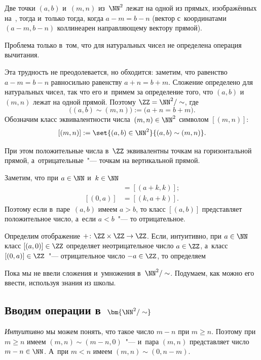Две точки $(a, b)$ и~$(m, n)$ из~$\NN^2$ лежат на одной из прямых, изображённых на~, тогда и~только тогда, когда $a - m = b - n$ (вектор с~координатами $(a - m, b - n)$ коллинеарен направляющему вектору прямой).


Проблема только в~том, что для натуральных чисел не определена операция вычитания.

Эта трудность не преодолевается, но обходится: заметим, что равенство $a - m = b - n$ равносильно равенству $a + n = b + m$. Сложение определено для натуральных чисел, так что его и~примем за определение того, что $(a, b)$ и~$(m, n)$ лежат на одной прямой. Поэтому
$\ZZ = \NN^2 / \sim$, где
\[
	\bigl(
		(a, b) \sim
		(m, n)
	\bigr)
	:=
	\bigl(
		a + n = b + m
	\bigr)
	.
\]
Обозначим класс эквивалентности числа~$(m, n) \in \NN^2$ символом $[(m, n)]$:
\[
	[(m, n)] :=
	\set{(a, b) \in \NN^2}{(a, b) \sim (m, n)}.
\]

При этом положительные числа в~$\ZZ$ эквивалентны точкам на горизонтальной прямой, а~отрицательные~"--- точкам на вертикальной прямой.


Заметим, что при $a \in \NN$ и~$k \in \NN$
\begin{align*}
	[(a, 0)] &= [(a + k, k)];
	\\
	[(0, a)] &= [(k, a + k)].
\end{align*}
Поэтому если в~паре~$(a, b)$ имеем $a > b$, то класс $[(a, b)]$ представляет положительное число, а~если $a < b$~"--- то отрицательное.


Определим отображение $+ \colon \ZZ \times \ZZ \to \ZZ$. Если, интуитивно, при $a \in \NN$ класс $[(a, 0)] \in \ZZ$ определяет неотрицательное число $a \in \ZZ$, а~класс $[(0, a)] \in \ZZ$~"--- отрицательное число $-a \in \ZZ$, то определяем


Пока мы не ввели сложения и~умножения в~$\NN^2 / \sim$. Подумаем, как можно его ввести, используя знания из школы.

\subsection[Вводим операции в~$\NN^2/\sim$]{Вводим операции в~$\bm{\NN^2/\sim}$}

\emph{Интуитивно} мы можем понять, что такое число $m - n$ при $m \geq n$. Поэтому при $m \geq n$ имеем $(m, n) \sim (m - n, 0)$~"--- и~пара $(m, n)$ представляет число $m - n \in \NN$. А~при $m < n$ имеем $(m, n) \sim (0, n - m)$.

